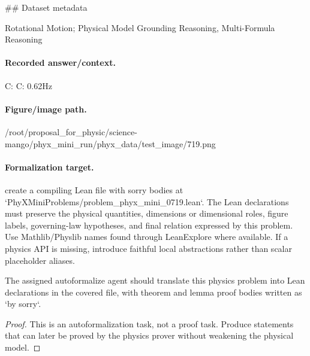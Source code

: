 \#\# Dataset metadata

Rotational Motion; Physical Model Grounding Reasoning, Multi-Formula Reasoning

\paragraph{Recorded answer/context.}
C: C: 0.62Hz

\paragraph{Figure/image path.}
/root/proposal\_for\_physic/science-mango/phyx\_mini\_run/phyx\_data/test\_image/719.png

\paragraph{Formalization target.}
create a compiling Lean file with sorry bodies at `PhyXMiniProblems/problem\_phyx\_mini\_0719.lean`. The Lean declarations must preserve the physical quantities, dimensions or dimensional roles, figure labels, governing-law hypotheses, and final relation expressed by this problem.
Use Mathlib/Physlib names found through LeanExplore where available. If a physics API is missing, introduce faithful local abstractions rather than scalar placeholder aliases.

\begin{theorem}
\label{thm:physics:phyx_mini_0719:target}
The assigned autoformalize agent should translate this physics problem into Lean declarations in the covered file, with theorem and lemma proof bodies written as `by sorry`.
\end{theorem}
\begin{proof}
This is an autoformalization task, not a proof task. Produce statements that can later be proved by the physics prover without weakening the physical model.
\end{proof}


